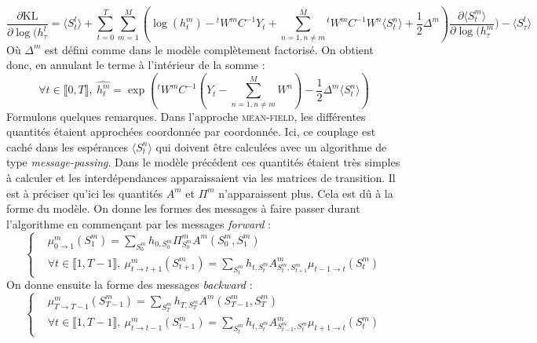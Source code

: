 \documentclass[10pt,a4paper]{article}
\newcommand{\meanfield}{\textsc{mean-field}}
\begin{document}
\begin{equation}
\frac{\partial \text{KL}}{\partial \log(h_{\tau}^l} = \langle S_t^l \rangle + 
\underset{t=0}{\overset{T}{\sum}} \underset{m=1}{\overset{M}{\sum}} \left( 
\log(h_t^m) -{}^t W^mC^{-1}Y_t + \underset{n=1, n \neq 
m}{\overset{M}{\sum}}{}^t W^m C^{-1} W^n \langle S_t^n \rangle + 
\frac{1}{2}\Delta^m \right) \frac{\partial \langle S_t^m \rangle}{\partial 
\log(h_{\tau}^m})-\langle S_{\tau}^l \rangle
\end{equation}
Où $\Delta^m$ est défini comme dans le modèle complètement factorisé. On 
obtient donc, en annulant le terme à l'intérieur de la somme :
\begin{equation}
\forall t \in \llbracket 0,T \rrbracket, \ \hat{h_t^m} = \exp \left( 
{}^tW^mC^{-1} \left( Y_t - \underset{n=1, n \neq m}{\overset{M}{\sum}} W^n 
\right) -\frac{1}{2} \Delta^m \langle S_t^n \rangle \right)
\end{equation}
Formulons quelques remarques. Dans l'approche \meanfield, les différentes 
quantités étaient approchées coordonnée par coordonnée. Ici, ce couplage est 
caché dans les espérances $\langle S_t^n \rangle$ qui doivent être calculées 
avec un algorithme de type \textit{message-passing}. Dans le modèle précédent 
ces quantités étaient très simples à calculer et les interdépendances 
apparaissaient via les matrices de transition. Il est à préciser qu'ici les 
quantités $A^m$ et $\Pi^m$ n'apparaissent plus. Cela est dû à la forme du 
modèle. On donne les formes des messages à faire passer durant l'algorithme en 
commençant par les messages \textit{forward} :
\begin{equation}
\left \lbrace
\begin{aligned}
& \mu_{0 \rightarrow 1}^m(S_1^m) = \underset{S_0^m}{\sum} h_{0,S_0^m} 
\Pi^m_{S_0^m} A^m(S_0^m, S_1^m) \\
&\forall t \in \llbracket 1,T-1 \rrbracket, \ \mu_{t \rightarrow 
t+1}^m(S_{t+1}^m)=\underset{S_t^m}{\sum} h_{t,S_t^m} A_{S_t^m,S_{t+1}^m}^m 
\mu_{t-1 \rightarrow t}(S_t^m)
\end{aligned}
\right.
\end{equation}
On donne ensuite la forme des messages \textit{backward} : 
\begin{equation}
\left \lbrace
\begin{aligned}
& \mu_{T \rightarrow T-1}^m(S_{T-1}^m) = \underset{S_T^m}{\sum} h_{T,S_T^m} 
A^m(S_{T-1}^m, S_T^m) \\
&\forall t \in \llbracket 1,T-1 \rrbracket, \ \mu_{t \rightarrow 
t-1}^m(S_{t-1}^m)=\underset{S_t^m}{\sum} h_{t,S_t^m} A_{S_{t-1}^m,S_{t}^m}^m 
\mu_{t+1 \rightarrow t}(S_t^m)
\end{aligned}
\right.
\end{equation}
\end{document}
